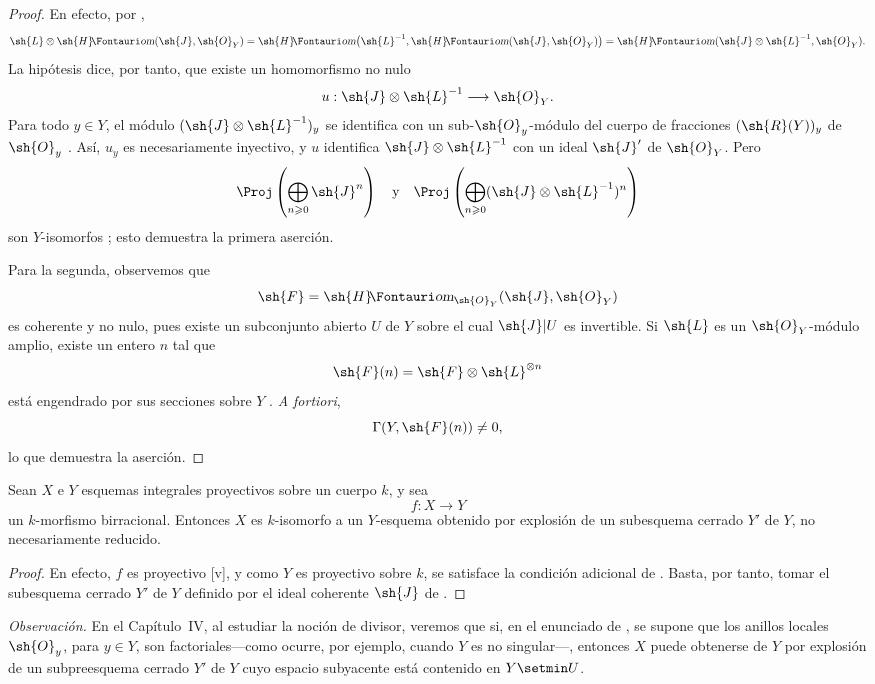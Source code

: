 \documentclass[oneside]{amsart}
\makeatletter
\renewcommand{\geq}{\geqslant}
\newcommand*{\ega@sheafop}[3]{\sh{#1}#2\textup{\kern-2.2pt{\Fontauri\slshape #3}}}
\newcommand*{\shHom}{\ega@sheafop{H}{}{om}}
\newcommand{\oldpage}[2][]{{\marginnote{\normalfont\textbf{#1}~|~#2}}\ignorespaces}
\let\EGAOriginalLabel\label
\renewcommand{\label}[1]{\phantomsection\EGAOriginalLabel{#1}}
\makeatother
\begin{document}
\begin{proof}
En efecto, por ,
\[
  \sh{L}\otimes\shHom(\sh{J},\sh{O}_Y)
  =\shHom\bigl(\sh{L}^{-1},\shHom(\sh{J},\sh{O}_Y)\bigr)
  =\shHom(\sh{J}\otimes\sh{L}^{-1},\sh{O}_Y).
\]
La hipótesis dice, por tanto, que existe un homomorfismo no nulo
\[
  u:\sh{J}\otimes\sh{L}^{-1}\longrightarrow\sh{O}_Y.
\]
Para todo $y\in Y$, el módulo $(\sh{J}\otimes\sh{L}^{-1})_y$ se identifica con un sub-$\sh{O}_y$-módulo del cuerpo de fracciones $(\sh{R}(Y))_y$ de $\sh{O}_y$ .
Así, $u_y$ es necesariamente inyectivo, y $u$ identifica $\sh{J}\otimes\sh{L}^{-1}$ con un ideal $\sh{J}'$ de $\sh{O}_Y$.
Pero
\[
  \Proj\left(\bigoplus_{n\geq0}\sh{J}^n\right)
  \quad\text{y}\quad
  \Proj\left(\bigoplus_{n\geq0}
  (\sh{J}\otimes\sh{L}^{-1})^n\right)
\]
son $Y$-isomorfos ; esto demuestra la primera aserción.

Para la segunda, observemos que
\[
  \sh{F}=\shHom_{\sh{O}_Y}(\sh{J},\sh{O}_Y)
\]
es coherente y no nulo, pues existe un subconjunto abierto $U$ de $Y$ sobre el cual $\sh{J}|U$ es invertible.
Si $\sh{L}$ es un $\sh{O}_Y$-módulo amplio, existe un entero $n$ tal que
\[
  \sh{F}(n)=\sh{F}\otimes\sh{L}^{\otimes n}
\]
está engendrado por sus secciones sobre $Y$ .
\emph{A fortiori},
\[
  \Gamma(Y,\sh{F}(n))\neq0,
\]
lo que demuestra la aserción.
\end{proof}

\begin{corollary}[2.3.7]
\label{III.2.3.7}
Sean $X$ e $Y$ esquemas integrales proyectivos sobre un cuerpo $k$, y sea
\[
  f:X\longrightarrow Y
\]
un $k$-morfismo birracional.
Entonces $X$ es $k$-isomorfo a un $Y$-esquema obtenido por explosión de un subesquema cerrado $Y'$ de $Y$, no necesariamente reducido.
\end{corollary}

\begin{proof}
\oldpage[III]{107}
En efecto, $f$ es proyectivo [v], y como $Y$ es proyectivo sobre $k$, se satisface la condición adicional de .
Basta, por tanto, tomar el subesquema cerrado $Y'$ de $Y$ definido por el ideal coherente $\sh{J}$ de .
\end{proof}

\begin{env}[2.3.8]
\label{III.2.3.8}
\emph{Observación.}
En el Capítulo~IV, al estudiar la noción de divisor, veremos que si, en el enunciado de , se supone que los anillos locales $\sh{O}_y$, para $y\in Y$, son factoriales---como ocurre, por ejemplo, cuando $Y$ es no singular---, entonces $X$ puede obtenerse de $Y$ por explosión de un subpreesquema cerrado $Y'$ de $Y$ cuyo espacio subyacente está contenido en $Y\setmin U$.
\end{env}
\end{document}
